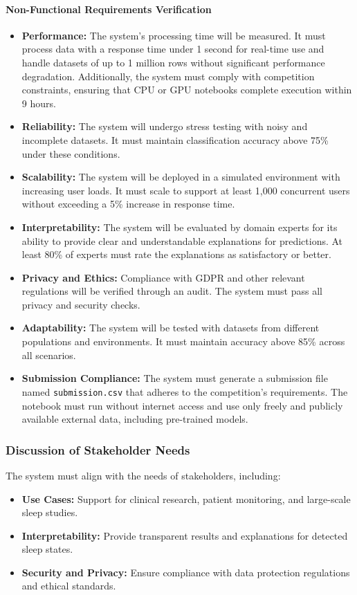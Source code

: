 \documentclass[conference]{IEEEtran}
\begin{document}
\paragraph{Non-Functional Requirements Verification}
\begin{itemize}
    \item \textbf{Performance:} The system's processing time will be measured. It must process data with a response time under 1 second for real-time use and handle datasets of up to 1 million rows without significant performance degradation. Additionally, the system must comply with competition constraints, ensuring that CPU or GPU notebooks complete execution within 9 hours.
    \item \textbf{Reliability:} The system will undergo stress testing with noisy and incomplete datasets. It must maintain classification accuracy above 75\% under these conditions.
    \item \textbf{Scalability:} The system will be deployed in a simulated environment with increasing user loads. It must scale to support at least 1,000 concurrent users without exceeding a 5\% increase in response time.
    \item \textbf{Interpretability:} The system will be evaluated by domain experts for its ability to provide clear and understandable explanations for predictions. At least 80\% of experts must rate the explanations as satisfactory or better.
    \item \textbf{Privacy and Ethics:} Compliance with GDPR and other relevant regulations will be verified through an audit. The system must pass all privacy and security checks.
    \item \textbf{Adaptability:} The system will be tested with datasets from different populations and environments. It must maintain accuracy above 85\% across all scenarios.
    \item \textbf{Submission Compliance:} The system must generate a submission file named \texttt{submission.csv} that adheres to the competition's requirements. The notebook must run without internet access and use only freely and publicly available external data, including pre-trained models.
\end{itemize}


\subsubsection{Discussion of Stakeholder Needs}
The system must align with the needs of stakeholders, including:
\begin{itemize}
	\item \textbf{Use Cases:} Support for clinical research, patient monitoring, and large-scale sleep studies.
	\item \textbf{Interpretability:} Provide transparent results and explanations for detected sleep states.
	\item \textbf{Security and Privacy:} Ensure compliance with data protection regulations and ethical standards.
\end{itemize}
\end{document}
